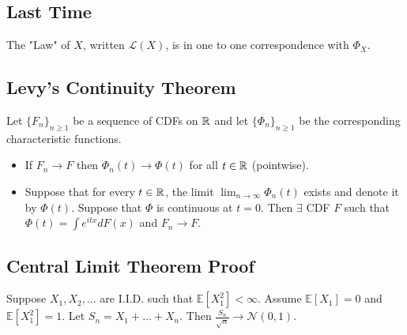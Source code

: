\documentclass[english, course]{Notes}
\begin{document}
\subsection{Last Time}

The "Law" of $X$, written $\mathcal{L}(X)$, is in one to one correspondence with $\Phi_X$.\\

\subsection{Levy's Continuity Theorem}

\begin{theorem}
Let $\{F_n\}_{n \geq 1}$ be a sequence of CDFs on $\mathbb{R}$ and let $\{\Phi_n\}_{n \geq 1}$ be the corresponding characteristic functions.\\

\begin{itemize}
	\item If $F_n \to F$ then $\Phi_n(t) \to \Phi(t)$ for all $t \in \mathbb{R}$ (pointwise).
	\item Suppose that for every $t \in \mathbb{R}$, the limit $\lim_{n \to \infty} \Phi_n(t)$ exists and denote it by $\Phi(t)$. Suppose that $\Phi$ is continuous at $t = 0$. Then $\exists$ CDF $F$ such that $\Phi(t) = \int e^{itx} dF(x)$ and $F_n \to F$.
\end{itemize}
\end{theorem}

\subsection{Central Limit Theorem Proof}

\begin{theorem}
Suppose $X_1, X_2, \dots$ are I.I.D. such that $\mathbb{E}[X_1^2] < \infty$. Assume $\mathbb{E}[X_1] = 0$ and $\mathbb{E}[X_1^2] = 1$. Let $S_n = X_1 + \dots + X_n$. Then $\frac{S_n}{\sqrt{n}} \to \mathcal{N}(0, 1)$.\\
\end{theorem}
\end{document}
